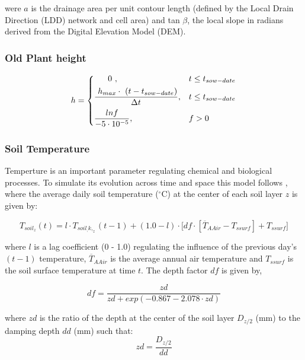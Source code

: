 \documentclass[]{article}
\begin{document}
were \(a\) is the drainage area per unit contour length (defined by the
Local Drain Direction (LDD) network and cell area) and tan \(\beta\),
the local slope in radians derived from the Digital Elevation Model
(DEM).

\hypertarget{old-plant-height}{%
\subsubsection{Old Plant height}\label{old-plant-height}}

\begin{equation} 
    h = 
\begin{dcases}
     ~~~~~0~,                                     & t \leq t_{sow-date} \\
     \frac{~h_{max} \cdot~(t-t_{sow-date})}{\Delta t_{}} ,     & t \leq t_{sow-date} \\
    \frac{lnf}{-5\cdot10^{-5}},              & f > 0 
\end{dcases}
\end{equation}

\hypertarget{soil-temperature}{%
\subsubsection{Soil Temperature}\label{soil-temperature}}

Temperture is an important parameter regulating chemical and biological
processes. To simulate its evolution across time and space this model
follows \citep{Neitsch2009}, where the average daily soil temperature
(\(^{\circ}\)C) at the center of each soil layer \(z\) is given by:

\begin{equation}
T_{soil_z}(t) = l \cdot T_{soil_, k,_z}(t-1) + (1.0 - l) \cdot \big[df \cdot [\overline{T}_{AAir} - T_{ssurf}]+T_{ssurf}]
\label{eq:tempSoil} 
\end{equation}

where \(l\) is a lag coefficient (0 - 1.0) regulating the influence of
the previous day's \((t-1)\) temperature, \(\overline{T}_{AAir}\) is the
average annual air temperature and \(T_{ssurf}\) is the soil surface
temperature at time \(t\). The depth factor \(df\) is given by,

\begin{equation}
df = \frac{zd}{zd+exp(-0.867-2.078 \cdot zd)}
\label{eq:df} 
\end{equation}

where \(zd\) is the ratio of the depth at the center of the soil layer
\(D_{z/2}\) (mm) to the damping depth \(dd\) (mm) such that:
\begin{equation}
zd = \frac{D_{z/2}}{dd}
\label{eq:zd} 
\end{equation}
\end{document}
